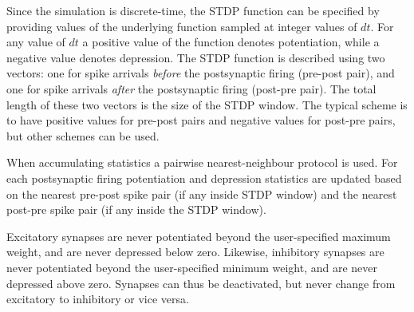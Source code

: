 \documentclass[a4paper]{article}
\begin{document}
Since the simulation is discrete-time,
	the STDP function can be specified by providing values of the underlying function
	sampled at integer values of $dt$.
For any value of $dt$ a positive value of the function denotes potentiation, 
	while a negative value denotes depression.
The STDP function is described using two vectors: 
	one for spike arrivals \emph{before} the postsynaptic firing (pre-post pair),
	and one for spike arrivals \emph{after} the postsynaptic firing (post-pre pair).
The total length of these two vectors is the size of the STDP window.
The typical scheme is to have positive values for pre-post pairs and negative values for post-pre pairs,
but other schemes can be used.

When accumulating statistics a pairwise nearest-neighbour protocol is used.
For each postsynaptic firing potentiation and depression statistics are updated based
on the nearest pre-post spike pair (if any inside STDP window) 
and the nearest post-pre spike pair (if any inside the STDP window).

Excitatory synapses are never potentiated beyond the user-specified maximum weight,
and are never depressed below zero.
Likewise, inhibitory synapses are never potentiated beyond the  user-specified minimum weight,
and are never depressed above zero.
Synapses can thus be deactivated, but never change from excitatory to inhibitory or vice versa.







\end{document}
